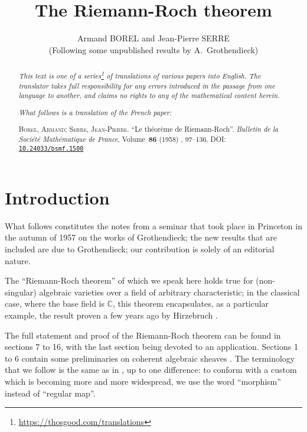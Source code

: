 \documentclass{article}
\title{The Riemann-Roch theorem}
\author{Armand BOREL and Jean-Pierre SERRE\\(Following some unpublished results by A.~Grothendieck)}
\date{}
\newcommand{\doctype}{French paper}
\newcommand{\origcit}{%
  \textsc{Borel, Armand}; \textsc{Serre, Jean-Pierre}.
  ``Le th\'{e}or\`{e}me de Riemann-Roch''.
  \emph{Bulletin de la Soci\'{e}t\'{e} Math\'{e}matique de France}, Volume~\textbf{86} (1958) , 97--136.
  DOI: \href{https://www.doi.org/10.24033/bsmf.1500}{\texttt{10.24033/bsmf.1500}}%
}
\newcommand{\oldpage}[1]{\marginpar{\footnotesize$\Big\vert$ \textit{p.~#1}}}
\begin{document}
\maketitle
\thispagestyle{fancy}

\renewcommand{\abstractname}{Translator's note.}

\begin{abstract}
  \renewcommand*{\thefootnote}{\fnsymbol{footnote}}
  \emph{This text is one of a series\footnote{\url{https://thosgood.com/translations}} of translations of various papers into English.}
  \emph{The translator takes full responsibility for any errors introduced in the passage from one language to another, and claims no rights to any of the mathematical content herein.}

  \medskip
  
  \emph{What follows is a translation of the \doctype:}

  \medskip\noindent
  \origcit
\end{abstract}

\setcounter{footnote}{0}

\tableofcontents



\section*{Introduction}

\oldpage{97}
What follows constitutes the notes from a seminar that took place in Princeton in the autumn of 1957 on the works of Grothendieck;
the new results that are included are due to Grothendieck;
our contribution is solely of an editorial nature.

The ``Riemann-Roch theorem'' of which we speak here holds true for (non-singular) algebraic varieties over a field of arbitrary characteristic;
in the classical case, where the base field is $\mathbb{C}$, this theorem encapsulates, as a particular example, the result proven a few years ago by Hirzebruch \cite{9}.

The full statement and proof of the Riemann-Roch theorem can be found in sections 7 to 16, with the last section being devoted to an application.
Sections 1 to 6 contain some preliminaries on coherent algebraic sheaves \cite{12}.
The terminology that we follow is the same as in \cite{12}, up to one difference: to conform with a custom which is becoming more and more widespread, we use the word ``morphism'' instead of ``regular map''.
\end{document}
